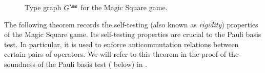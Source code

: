 \begin{figure}[!htbp]
  \centering
  \caption{Type graph $G^\ms$ for the Magic Square game.  }
  \label{fig:type-graph-ms}
\end{figure}

The following theorem records the self-testing (also known as \emph{rigidity})
properties of the Magic Square game.
Its self-testing properties
are crucial to the Pauli basis test.
In particular, it is used to enforce anticommutation relations between certain
pairs of operators.
We will refer to this theorem in the proof of the soundness of the Pauli basis test ( below) in .

